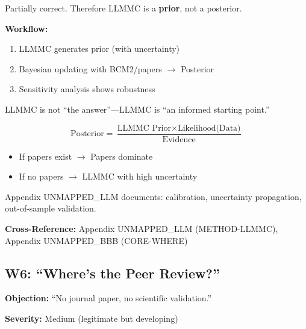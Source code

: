 \begin{axiom}
Partially correct. Therefore LLMMC is a \textbf{prior}, not a posterior.

\textbf{Workflow:}
\begin{enumerate}
    \item LLMMC generates prior (with uncertainty)
    \item Bayesian updating with BCM2/papers $\rightarrow$ Posterior
    \item Sensitivity analysis shows robustness
\end{enumerate}

LLMMC is not ``the answer''---LLMMC is ``an informed starting point.''

\begin{equation}
\text{Posterior} = \frac{\text{LLMMC Prior} \times \text{Likelihood(Data)}}{\text{Evidence}}
\end{equation}

\begin{itemize}[nosep]
    \item If papers exist $\rightarrow$ Papers dominate
    \item If no papers $\rightarrow$ LLMMC with high uncertainty
\end{itemize}

Appendix UNMAPPED_LLM documents: calibration, uncertainty propagation, out-of-sample validation.
\end{axiom}

\textbf{Cross-Reference:} Appendix UNMAPPED_LLM (METHOD-LLMMC), Appendix UNMAPPED_BBB (CORE-WHERE)

\subsection{W6: ``Where's the Peer Review?''}
\label{sec:da-w6}

\begin{tcolorbox}[colback=gray!5!white, colframe=gray!75!black]
\textbf{Objection:} ``No journal paper, no scientific validation.''

\textbf{Severity:} Medium (legitimate but developing)
\end{tcolorbox}

